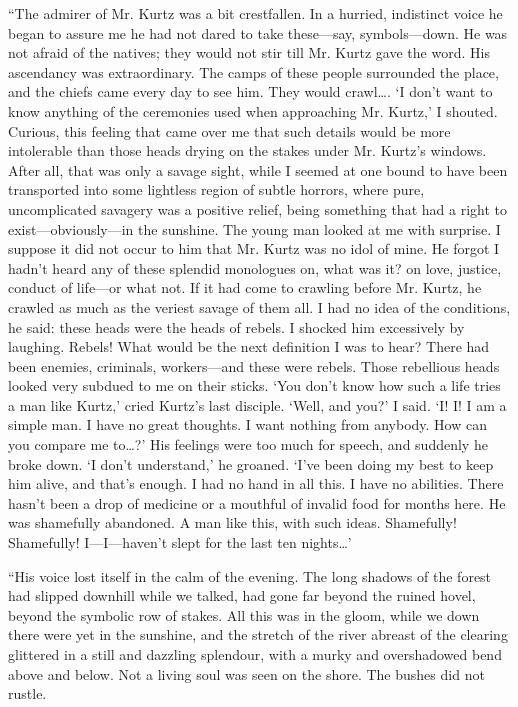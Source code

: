 \documentclass[12pt]{report}
\begin{document}
``The admirer of Mr. Kurtz was a bit crestfallen. In a hurried,
indistinct voice he began to assure me he had not dared to take
these---say, symbols---down. He was not afraid of the natives; they
would not stir till Mr. Kurtz gave the word. His ascendancy was
extraordinary. The camps of these people surrounded the place, and the
chiefs came every day to see him. They would crawl\ldots{}. `I don't
want to know anything of the ceremonies used when approaching Mr.
Kurtz,' I shouted. Curious, this feeling that came over me that such
details would be more intolerable than those heads drying on the stakes
under Mr. Kurtz's windows. After all, that was only a savage sight,
while I seemed at one bound to have been transported into some lightless
region of subtle horrors, where pure, uncomplicated savagery was a
positive relief, being something that had a right to
exist---obviously---in the sunshine. The young man looked at me with
surprise. I suppose it did not occur to him that Mr. Kurtz was no idol
of mine. He forgot I hadn't heard any of these splendid monologues on,
what was it? on love, justice, conduct of life---or what not. If it had
come to crawling before Mr. Kurtz, he crawled as much as the veriest
savage of them all. I had no idea of the conditions, he said: these
heads were the heads of rebels. I shocked him excessively by laughing.
Rebels! What would be the next definition I was to hear? There had been
enemies, criminals, workers---and these were rebels. Those rebellious
heads looked very subdued to me on their sticks. `You don't know how
such a life tries a man like Kurtz,' cried Kurtz's last disciple. `Well,
and you?' I said. `I! I! I am a simple man. I have no great thoughts. I
want nothing from anybody. How can you compare me to\ldots{}?' His
feelings were too much for speech, and suddenly he broke down. `I don't
understand,' he groaned. `I've been doing my best to keep him alive, and
that's enough. I had no hand in all this. I have no abilities. There
hasn't been a drop of medicine or a mouthful of invalid food for months
here. He was shamefully abandoned. A man like this, with such ideas.
Shamefully! Shamefully! I---I---haven't slept for the last ten
nights\ldots{}'

``His voice lost itself in the calm of the evening. The long shadows of
the forest had slipped downhill while we talked, had gone far beyond the
ruined hovel, beyond the symbolic row of stakes. All this was in the
gloom, while we down there were yet in the sunshine, and the stretch of
the river abreast of the clearing glittered in a still and dazzling
splendour, with a murky and overshadowed bend above and below. Not a
living soul was seen on the shore. The bushes did not rustle.
\end{document}
